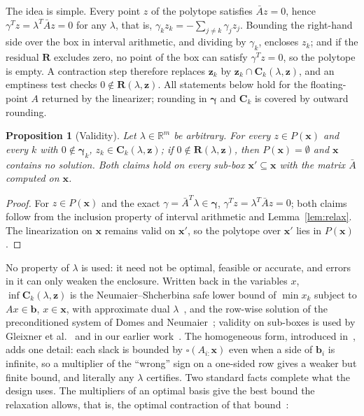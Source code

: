 \documentclass[11pt]{article}
\newcommand{\iv}[1]{\mathbf{#1}}          %
\newcommand{\R}{\mathbb{R}}
\newcommand{\Abar}{\bar{A}}
\newcommand{\inff}{\operatorname{inf}}
\newtheorem{proposition}{Proposition}
\theoremstyle{definition}
\theoremstyle{remark}
\begin{document}
The idea is simple. Every point $z$ of the polytope satisfies
$\Abar z=0$, hence $\gamma^T z=\lambda^T\Abar z=0$ for any $\lambda$, that is,
$\gamma_k z_k=-\sum_{j\neq k}\gamma_j z_j$. Bounding the right-hand side over
the box in interval arithmetic, and dividing by $\gamma_k$, encloses $z_k$; and
if the residual $\iv{R}$ excludes zero, no point of the box can satisfy
$\gamma^Tz=0$, so the polytope is empty. A contraction step therefore replaces
$\iv{z}_k$ by $\iv{z}_k\cap\iv{C}_k(\lambda,\iv{z})$, and an emptiness test
checks $0\notin\iv{R}(\lambda,\iv{z})$. All statements below hold for the
floating-point $A$ returned by the linearizer; rounding in $\iv{\gamma}$ and
$\iv{C}_k$ is covered by outward rounding.

\begin{proposition}[Validity]\label{prop:valid}
Let $\lambda\in\R^m$ be arbitrary. For every $z\in P(\iv{x})$ and every $k$
with $0\notin\iv{\gamma}_k$, $z_k\in\iv{C}_k(\lambda,\iv{z})$; if
$0\notin\iv{R}(\lambda,\iv{z})$, then $P(\iv{x})=\emptyset$ and $\iv{x}$
contains no solution. Both claims hold on every sub-box $\iv{x}'\subseteq\iv{x}$
with the matrix $\Abar$ computed on $\iv{x}$.
\end{proposition}
\begin{proof}
For $z\in P(\iv{x})$ and the exact $\gamma=\Abar^T\lambda\in\iv{\gamma}$,
$\gamma^Tz=\lambda^T\Abar z=0$; both claims follow from the inclusion property
of interval arithmetic and Lemma~\ref{lem:relax}. The linearization on
$\iv{x}$ remains valid on $\iv{x}'$, so the polytope over $\iv{x}'$ lies in
$P(\iv{x})$.
\end{proof}

No property of $\lambda$ is used: it need not be optimal, feasible or
accurate, and errors in it can only weaken the enclosure. Written back in the
variables $x$, $\inff\iv{C}_k(\lambda,\iv{z})$ is the Neumaier--Shcherbina safe
lower bound of $\min x_k$ subject to $Ax\in\iv{b}$, $x\in\iv{x}$, with
approximate dual $\lambda$~\cite{neumaier2004safe}, and the row-wise solution
of the preconditioned system of Domes and Neumaier~\cite[\S5]{domes2012rigorous};
validity on sub-boxes is used by Gleixner et al.~\cite{gleixner2017three} and
in our earlier work~\cite{reyes2023preconditioning}. The homogeneous form,
introduced in~\cite{reyes2023preconditioning}, adds one detail: each slack is
bounded by $\square(A_{i:}\iv{x})$ even when a side of $\iv{b}_i$ is infinite,
so a multiplier of the ``wrong'' sign on a one-sided row gives a weaker but
finite bound, and literally any $\lambda$ certifies. Two standard facts
complete what the design uses. The multipliers of an optimal basis give the
best bound the relaxation allows, that is, the optimal contraction of that
bound~\cite[Prop.~1]{reyes2023preconditioning}:
\end{document}
